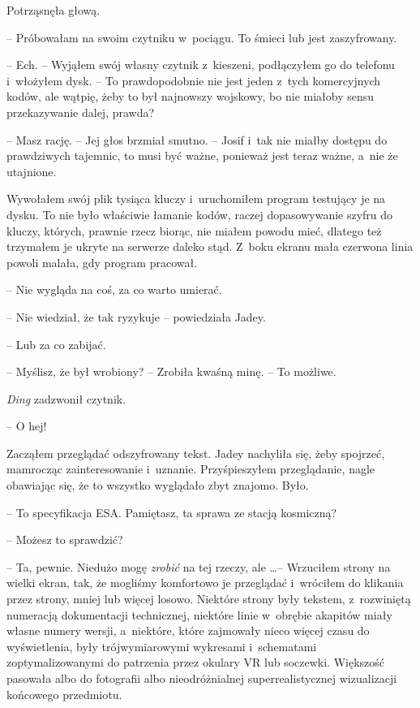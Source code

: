 \documentclass[oneside,polish,12pt,sfheadings]{mwbk}
\begin{document}
Potrząsnęła głową. 

-- Próbowałam na swoim czytniku w~pociągu. To śmieci lub jest zaszyfrowany.

-- Ech. -- Wyjąłem swój własny czytnik z~kieszeni, podłączyłem go do
telefonu i~włożyłem dysk. -- To prawdopodobnie nie jest jeden z~tych
komercyjnych kodów, ale wątpię, żeby to był najnowszy wojskowy, bo nie
miałoby sensu przekazywanie dalej, prawda?

-- Masz rację. -- Jej głos brzmiał smutno. -- Josif i~tak nie miałby
dostępu do prawdziwych tajemnic, to musi być ważne, ponieważ jest teraz
ważne, a~nie że utajnione.

Wywołałem swój plik tysiąca kluczy i~uruchomiłem program testujący je na
dysku. To nie było właściwie łamanie kodów, raczej dopasowywanie szyfru
do kluczy, których, prawnie rzecz biorąc, nie miałem powodu mieć,
dlatego też trzymałem je ukryte na serwerze daleko stąd. Z~boku ekranu
mała czerwona linia powoli malała, gdy program pracował.

-- Nie wygląda na coś, za co warto umierać.

-- Nie wiedział, że tak ryzykuje -- powiedziała Jadey.

-- Lub za co zabijać.

-- Myślisz, że był wrobiony? -- Zrobiła kwaśną minę. -- To możliwe.

\emph{Ding} zadzwonił czytnik.

-- O hej!

Zacząłem przeglądać odszyfrowany tekst. Jadey nachyliła się, żeby
spojrzeć, mamrocząc zainteresowanie i~uznanie. Przyśpieszyłem
przeglądanie, nagle obawiając się, że to wszystko wyglądało zbyt
znajomo. Było.

-- To specyfikacja ESA. Pamiętasz, ta sprawa ze stacją kosmiczną?

-- Możesz to sprawdzić?

-- Ta, pewnie. Niedużo mogę \emph{zrobić} na tej rzeczy, ale \ldots --
Wrzuciłem strony na wielki ekran, tak, że mogliśmy komfortowo je
przeglądać i~wróciłem do klikania przez strony, mniej lub więcej losowo.
Niektóre strony były tekstem, z~rozwiniętą numeracją dokumentacji
technicznej, niektóre linie w~obrębie akapitów miały własne numery
wersji, a~niektóre, które zajmowały nieco więcej czasu do wyświetlenia,
były trójwymiarowymi wykresami i~schematami zoptymalizowanymi do
patrzenia przez okulary VR lub soczewki. Większość pasowała albo do
fotografii albo nieodróżnialnej superrealistycznej wizualizacji
końcowego przedmiotu.
\end{document}
